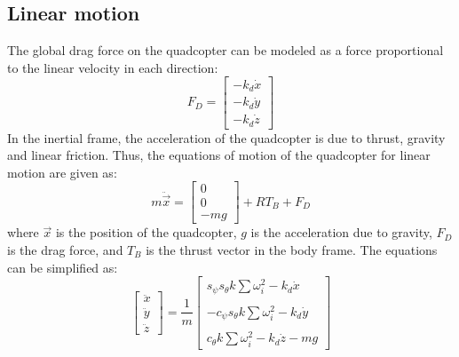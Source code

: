 \documentclass{article}
\begin{document}
\subsection{Linear motion}
The global drag force on the quadcopter can be modeled as a force proportional to the linear velocity in each direction:
\begin{equation}
\label{friction}
F_D = \begin{bmatrix} -k_d\dot{x} \\ -k_d\dot{y} \\ -k_d\dot{z} \end{bmatrix}
\end{equation}
In the inertial frame, the acceleration of the quadcopter is due to thrust, gravity and linear friction. Thus, the equations of motion of the quadcopter for linear motion are given as:
\begin{equation}
\label{linear}
m\ddot{\vec{x}} = \begin{bmatrix}0 \\ 0 \\ -mg \end{bmatrix} + RT_B + F_D
\end{equation}
where $\vec{x}$ is the position of the quadcopter, $g$ is the acceleration due to gravity, $F_D$ is the drag force, and $T_B$ is the thrust vector in the body frame. The equations can be simplified as:
\begin{equation}
\begin{bmatrix} \ddot{x} \\ \ddot{y} \\ \ddot{z} \end{bmatrix} = 
\frac{1}{m} \begin{bmatrix} s_{\psi}s_{\theta} k\sum\nolimits \omega_i^2 - k_d\dot{x} \\\\
							-c_{\psi}s_{\theta} k\sum\nolimits \omega_i^2 - k_d\dot{y} \\\\
							c_{\theta} k\sum\nolimits \omega_i^2 - k_d\dot{z}-mg 
			\end{bmatrix}
\end{equation}
\end{document}
